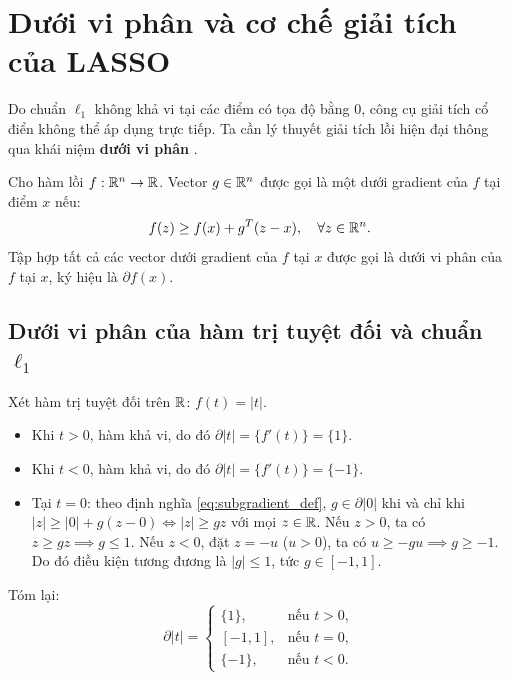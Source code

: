 \section{Dưới vi phân và cơ chế giải tích của LASSO}
Do chuẩn $\ell_1$ không khả vi tại các điểm có tọa độ bằng 0, công cụ giải tích cổ điển không thể áp dụng trực tiếp. Ta cần lý thuyết giải tích lồi hiện đại thông qua khái niệm \textbf{dưới vi phân} \cite{foucart2013mathematical, beck2009fast}.

\begin{definition}
Cho hàm lồi $f : \mathbb{R}^n \to \mathbb{R}$. Vector $g \in \mathbb{R}^n$ được gọi là một dưới gradient của $f$ tại điểm $x$ nếu:
\begin{equation}
    f(z) \ge f(x) + g^T(z - x), \quad \forall z \in \mathbb{R}^n.
    \label{eq:subgradient_def}
\end{equation}
Tập hợp tất cả các vector dưới gradient của $f$ tại $x$ được gọi là dưới vi phân của $f$ tại $x$, ký hiệu là $\partial f(x)$.
\end{definition}

\subsection{Dưới vi phân của hàm trị tuyệt đối và chuẩn $\ell_1$}
Xét hàm trị tuyệt đối trên $\mathbb{R}$: $f(t) = |t|$.
\begin{itemize}
    \item Khi $t > 0$, hàm khả vi, do đó $\partial |t| = \{f'(t)\} = \{1\}$.
    \item Khi $t < 0$, hàm khả vi, do đó $\partial |t| = \{f'(t)\} = \{-1\}$.
    \item Tại $t = 0$: theo định nghĩa \eqref{eq:subgradient_def}, $g \in \partial |0|$ khi và chỉ khi $|z| \ge |0| + g(z - 0) \iff |z| \ge gz$ với mọi $z \in \mathbb{R}$. Nếu $z > 0$, ta có $z \ge gz \implies g \le 1$. Nếu $z < 0$, đặt $z = -u$ ($u > 0$), ta có $u \ge -gu \implies g \ge -1$. Do đó điều kiện tương đương là $|g| \le 1$, tức $g \in [-1, 1]$.
\end{itemize}
Tóm lại:
\begin{equation}
    \partial |t| = 
    \begin{cases}
    \{1\}, & \text{nếu } t > 0, \\[0.1cm]
    [-1, 1], & \text{nếu } t = 0, \\[0.1cm]
    \{-1\}, & \text{nếu } t < 0.
    \end{cases}
\end{equation}

